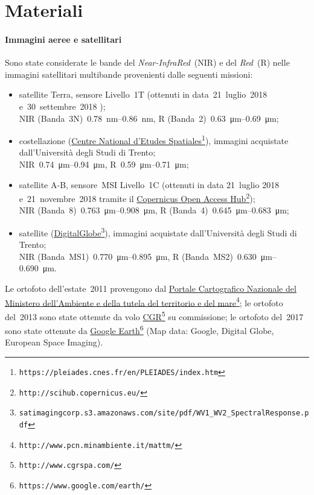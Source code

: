 \section{Materiali}
\paragraph{Immagini aeree e satellitari}
Sono state considerate le bande del \emph{Near-InfraRed}~(NIR) e del \emph{Red}~(R) nelle immagini satellitari multibande provenienti dalle seguenti missioni:
%
\begin{itemize}
	\item satellite Terra, sensore \AST{} Livello~1T (ottenuti in data~21~luglio~2018 e~30~settembre~2018 );  
		\\
		NIR (Banda~3N)~\SIrange[range-phrase={-}]{0.78}{0.86}{\nano\m}, R (Banda~2)~\SIrange[range-phrase={-}]{0.63}{0.69}{\micro\m};
	\item costellazione \Pl{} (\href{https://pleiades.cnes.fr/en/PLEIADES/index.htm}{Centre National d'Etudes Spatiales}\footnote{\texttt{https://pleiades.cnes.fr/en/PLEIADES/index.htm}}), immagini acquistate dall'Università degli Studi di Trento; 
		\\
		NIR~\SIrange[range-phrase={-}]{0.74}{0.94}{\micro\m}, R~\SIrange[range-phrase={-}]{0.59}{0.71}{\micro\m};
	\item satellite \Se{}A-B, sensore~MSI Livello~1C (ottenuti in data 21~luglio 2018 e~21~novembre~2018 tramite il \href{http://scihub.copernicus.eu/}{Copernicus Open Access Hub}\footnote{\texttt{http://scihub.copernicus.eu/}});
		\\
		NIR (Banda~8)~\SIrange[range-phrase={-}]{0.763}{0.908}{\micro\m}, R (Banda~4)~\SIrange[range-phrase={-}]{0.645}{0.683}{\micro\m};
	\item satellite \WV{} (\href{satimagingcorp.s3.amazonaws.com/site/pdf/WV1\_{}WV2\_{}SpectralResponse.pdf}{DigitalGlobe}\footnote{\texttt{satimagingcorp.s3.amazonaws.com/site/pdf/WV1\_{}WV2\_{}SpectralResponse.pdf}}), immagini acquistate dall'Università degli Studi di Trento;
		\\
		NIR (Banda~MS1)~\SIrange[range-phrase={-}]{0.770}{0.895}{\micro\m}, R (Banda~MS2)~\SIrange[range-phrase={-}]{0.630}{0.690}{\micro\m}.
\end{itemize}
%

Le ortofoto dell'estate~2011 provengono dal \href{http://www.pcn.minambiente.it/mattm/}{Portale Cartografico Nazionale del Ministero dell'Ambiente e della tutela del territorio e del mare}\footnote{\texttt{http://www.pcn.minambiente.it/mattm/}};
le ortofoto del~2013 sono state ottenute da volo \href{http://www.cgrspa.com/}{CGR}\footnote{\texttt{http://www.cgrspa.com/}} su commissione; 
le ortofoto del~2017 sono state ottenute da \href{https://www.google.com/earth/}{Google Earth}\footnote{\texttt{https://www.google.com/earth/}} (Map data: Google, Digital Globe, European Space Imaging).

